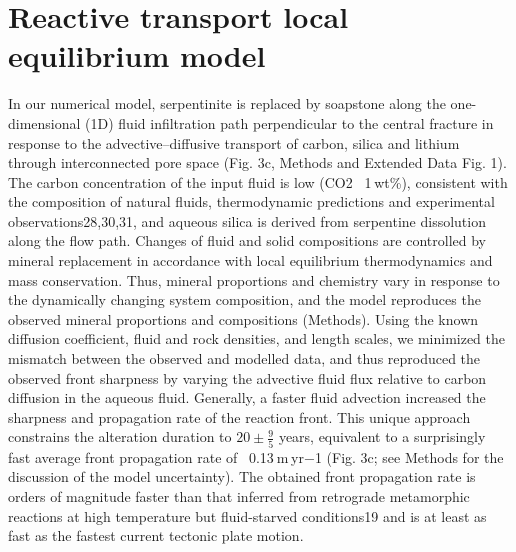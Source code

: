 \section*{Reactive transport local equilibrium model}

In our numerical model, serpentinite is replaced by soapstone along the one-dimensional (1D) fluid infiltration path perpendicular to the central fracture in response to the advective–diffusive transport of carbon, silica and lithium through interconnected pore space (Fig. 3c, Methods and Extended Data Fig. 1). The carbon concentration of the input fluid is low (CO2 ~1 wt\%), consistent with the composition of natural fluids, thermodynamic predictions and experimental observations28,30,31, and aqueous silica is derived from serpentine dissolution along the flow path. Changes of fluid and solid compositions are controlled by mineral replacement in accordance with local equilibrium thermodynamics and mass conservation. Thus, mineral proportions and chemistry vary in response to the dynamically changing system composition, and the model reproduces the observed mineral proportions and compositions (Methods). Using the known diffusion coefficient, fluid and rock densities, and length scales, we minimized the mismatch between the observed and modelled data, and thus reproduced the observed front sharpness by varying the advective fluid flux relative to carbon diffusion in the aqueous fluid. Generally, a faster fluid advection increased the sharpness and propagation rate of the reaction front. This unique approach constrains the alteration duration to $20\pm \frac{9}{5}$
years, equivalent to a surprisingly fast average front propagation rate of ~0.13 m yr−1 (Fig. 3c; see Methods for the discussion of the model uncertainty). The obtained front propagation rate is orders of magnitude faster than that inferred from retrograde metamorphic reactions at high temperature but fluid-starved conditions19 and is at least as fast as the fastest current tectonic plate motion.

